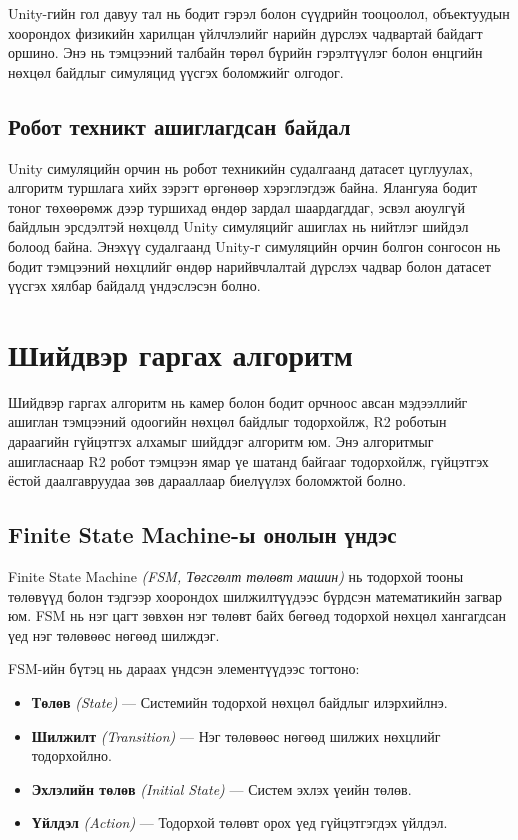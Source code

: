 Unity-гийн гол давуу тал нь бодит гэрэл болон сүүдрийн тооцоолол, объектуудын хоорондох физикийн харилцан үйлчлэлийг нарийн дүрслэх чадвартай байдагт оршино. Энэ нь тэмцээний талбайн төрөл бүрийн гэрэлтүүлэг болон өнцгийн нөхцөл байдлыг симуляцид үүсгэх боломжийг олгодог.

\subsection{Робот техникт ашиглагдсан байдал}

Unity симуляцийн орчин нь робот техникийн судалгаанд датасет цуглуулах, алгоритм туршлага хийх зэрэгт өргөнөөр хэрэглэгдэж байна. Ялангуяа бодит тоног төхөөрөмж дээр туршихад өндөр зардал шаардагддаг, эсвэл аюулгүй байдлын эрсдэлтэй нөхцөлд Unity симуляцийг ашиглах нь нийтлэг шийдэл болоод байна. Энэхүү судалгаанд Unity-г симуляцийн орчин болгон сонгосон нь бодит тэмцээний нөхцлийг өндөр нарийвчлалтай дүрслэх чадвар болон датасет үүсгэх хялбар байдалд үндэслэсэн болно.

\section{Шийдвэр гаргах алгоритм}

Шийдвэр гаргах алгоритм нь камер болон бодит орчноос авсан мэдээллийг ашиглан тэмцээний одоогийн нөхцөл байдлыг тодорхойлж, R2 роботын дараагийн гүйцэтгэх алхамыг шийддэг алгоритм юм. Энэ алгоритмыг ашигласнаар R2 робот тэмцээн ямар үе шатанд байгааг тодорхойлж, гүйцэтгэх ёстой даалгавруудаа зөв дарааллаар биелүүлэх боломжтой болно.

\subsection{Finite State Machine-ы онолын үндэс}

Finite State Machine \textit{(FSM, Төгсгөлт төлөвт машин)} нь тодорхой тооны төлөвүүд болон тэдгээр хоорондох шилжилтүүдээс бүрдсэн математикийн загвар юм. FSM нь нэг цагт зөвхөн нэг төлөвт байх бөгөөд тодорхой нөхцөл хангагдсан үед нэг төлөвөөс нөгөөд шилждэг.
 
FSM-ийн бүтэц нь дараах үндсэн элементүүдээс тогтоно:
 
\begin{itemize}
    \item \textbf{Төлөв} \textit{(State)} --- Системийн тодорхой нөхцөл байдлыг илэрхийлнэ.
    \item \textbf{Шилжилт} \textit{(Transition)} --- Нэг төлөвөөс нөгөөд шилжих нөхцлийг тодорхойлно.
    \item \textbf{Эхлэлийн төлөв} \textit{(Initial State)} --- Систем эхлэх үеийн төлөв.
    \item \textbf{Үйлдэл} \textit{(Action)} --- Тодорхой төлөвт орох үед гүйцэтгэгдэх үйлдэл.
\end{itemize}
 
